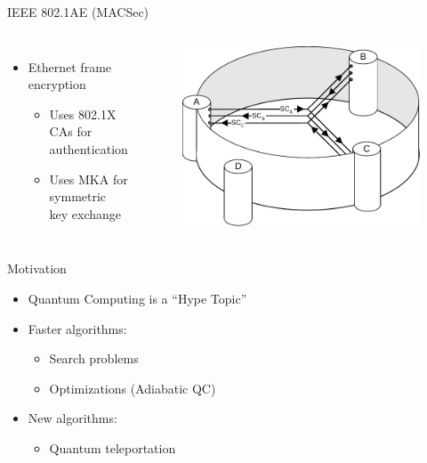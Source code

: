 \documentclass[fleqn,compress,utf8,aspectratio=169,t]{beamer}
\begin{document}
\begin{frame}{IEEE 802.1AE (MACSec)}
  \begin{columns}[t]
    \begin{itemize}
      \item Ethernet frame encryption
      \begin{itemize}
        \item<2-> Uses 802.1X CAs for authentication
        \item<3-> Uses MKA for symmetric key exchange
      \end{itemize}
    \end{itemize}
    \vspace*{-1cm}
      \begin{figure}[t]
        \centering\includegraphics[trim={0 0 0 2}, width=1\columnwidth]{8021ae_fig_7_6_ca.pdf}
    \end{figure}
    
  \end{columns}
\end{frame}


\begin{frame}{Motivation}
  \begin{itemize}
    \item Quantum Computing is a ``Hype Topic''
    \item<2-> Faster algorithms:
          \begin{itemize}
            \item Search problems
            \item Optimizations (Adiabatic QC)
          \end{itemize}
     \item<3-> New algorithms:
          \begin{itemize}
            \item Quantum teleportation
          \end{itemize}
  \end{itemize}
\end{frame}
\end{document}
